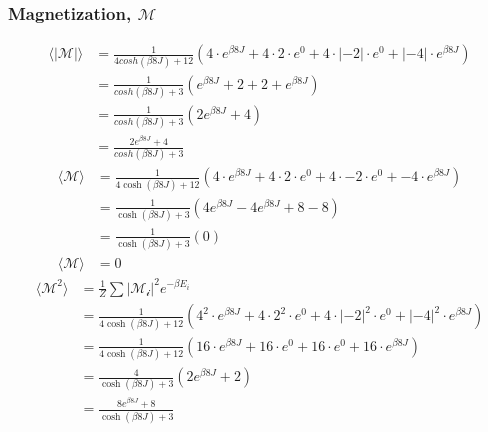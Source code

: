 \documentclass{article}
\begin{document}
\subsubsection*{Magnetization, $\mathcal M$}
\begin{align}\label{eq:mean_abs_mag}
    \langle \mathcal{|M|} \rangle &= \frac{1}{4cosh(\beta 8J) + 12} \left( 4 \cdot e^{\beta8J} + 4 \cdot 2 \cdot e^{0} + 4 \cdot |-2| \cdot e^{0} + |-4| \cdot e^{\beta 8J} \right)\nonumber \\
    &= \frac{1}{cosh(\beta 8J) + 3} ( e^{\beta 8J} + 2 +2 +e^{\beta 8J})\nonumber \\
    &=\frac{1}{cosh(\beta 8J) + 3} ( 2e^{\beta 8J} + 4)\nonumber \\
    &=\frac{ 2e^{\beta 8J} + 4}{cosh(\beta 8J) + 3}
\end{align}
\begin{align}\label{eq:mean_mag}
    \langle \mathcal{M} \rangle &= \frac{1}{4\cosh(\beta 8J) + 12} \left( 4 \cdot e^{\beta8J} + 4 \cdot 2 \cdot e^{0} + 4 \cdot -2 \cdot e^{0} + -4 \cdot e^{\beta 8J} \right)\nonumber \\
    &= \frac{1}{\cosh(\beta 8J) + 3} \left( 4e^{\beta 8J}-4e^{\beta 8J} + 8 -8  \right)\nonumber \\
    &=\frac{1}{\cosh(\beta 8J) + 3} \left( 0 \right)\nonumber\\
    \langle \mathcal{M} \rangle &=0
\end{align}
\begin{align}\label{eq:mean_mag_square}
    \langle \mathcal{M}^2 \rangle &= \frac{1}{Z}\sum |\mathcal{M_i}|^2 e^{-\beta E_i}\nonumber \\
    &= \frac{1}{4\cosh(\beta 8J) + 12} \left( 4^2 \cdot e^{\beta8J} + 4 \cdot 2^2 \cdot e^{0} + 4 \cdot |-2|^2 \cdot e^{0} + |-4|^2 \cdot e^{\beta 8J} \right)\nonumber \\
    &=\frac{1}{4\cosh(\beta 8J) + 12} \left( 16 \cdot e^{\beta8J} + 16 \cdot e^{0} + 16 \cdot e^{0} + 16 \cdot e^{\beta 8J} \right)\nonumber \\
    &=\frac{4}{\cosh(\beta 8J) + 3} \left( 2 e^{\beta8J} +  2 \right)\nonumber \\
    &=\frac{8 e^{\beta8J} +  8}{\cosh(\beta 8J) + 3}
\end{align}

\printbibliography
\end{document}
